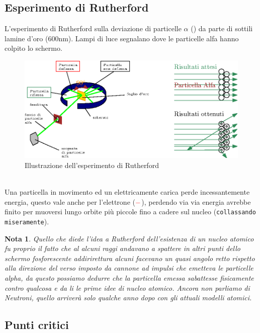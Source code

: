 \documentclass{book}
\newtheorem{nota}{Nota}[section]
\begin{document}
\subsection{Esperimento di Rutherford}
\label{sec:esperimentodiruth}
L'esperimento di Rutherford sulla deviazione di particelle $\alpha$ () da parte di sottili lamine d'oro (600nm). Lampi di luce segnalano dove le particelle alfa hanno colpito lo schermo.
\begin{figure}[ht!]
  \centering
  \includegraphics{./img/espRuth.eps}
  \caption{Illustrazione dell'esperimento di Rutherford}
  \label{fig:espruther}
\end{figure}\\
Una particella in movimento ed un elettricamente carica perde incessantemente energia, questo vale
anche per l'elettrone (${\color{red}-}$), perdendo via via energia avrebbe finito per muoversi lungo
orbite più piccole fino a cadere sul nucleo ({\tt collassando miseramente}).
\begin{nota}
  Quello che diede l'idea a Rutherford dell'esistenza di un nucleo atomico fu proprio il fatto che
  al alcuni raggi andavano a spattere in altri punti dello schermo fosforescente addirirettura alcuni
  facevano un quasi angolo retto rispetto alla direzione del verso imposto da cannone ad impulsi che
  emetteva le particelle alpha, da questo possiamo dedurre che la particella emessa sabattesse
  fisicamente contro qualcosa e da li le prime idee di nucleo atomico. Ancora non parliamo di Neutroni,
  quello arriverà solo qualche anno dopo con gli attuali modelli atomici.
\end{nota}
\subsection{Punti critici}
\label{sec:punticriticirutherford}
\end{document}
